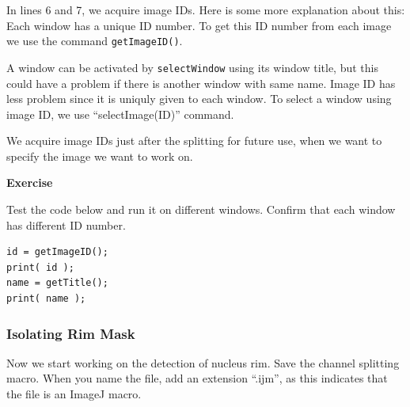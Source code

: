\documentclass[11pt,a4paper,oneside]{report}
\newenvironment{indentexercise}[1]
{{\setlength{\leftmargin}{2em}}
\textbf{Exercise \thesubsection-#1}
\begin{list}{}
	\item
}
{\end{list}}
\newenvironment{indentCom}
{\begin{list}{}
         {\setlength{\leftmargin}{1em}}
         \item[]
}
{\end{list}}
\newcommand{\ilcom}[1]{\texttt{\small#1}}
\begin{document}
In lines 6 and 7, we acquire image IDs. Here is some more explanation about this: Each window has a unique ID number. To get this ID number from each image we use the command \ilcom{getImageID()}.

\begin{indentCom}
\end{indentCom}

A window can be activated by \ilcom{selectWindow} using its window title, but this could have a problem if there is another window with same name. Image ID has less problem since it is uniquly given to each window. To select a window using image ID, we use ``selectImage(ID)'' command.

\begin{indentCom}

\end{indentCom}

We acquire image IDs just after the splitting for future use, when we want to specify the image we want to work on. 

\begin{indentexercise}{1}
Test the code below and run it on different windows. Confirm that each window has different ID number. 
\begin{lstlisting}
id = getImageID();
print( id );
name = getTitle();
print( name );
\end{lstlisting}
\end{indentexercise}


\subsubsection{Isolating Rim Mask}

Now we start working on the detection of nucleus rim. Save the channel splitting macro. When you name the file, add an extension ``.ijm'', as this indicates that the file is an ImageJ macro. 
\end{document}

